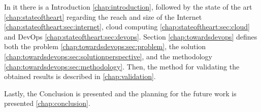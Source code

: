     	In it there is a Introduction \ref{chap:introduction}, followed by the state of the art \ref{chap:stateoftheart} regarding the reach and size of the Internet \ref{chap:stateoftheart:sec:internet}, cloud computing \ref{chap:stateoftheart:sec:cloud} and DevOps \ref{chap:stateoftheart:sec:devops}.
    	Section \ref{chap:towardsdevops} defines both the problem \ref{chap:towardsdevops:sec:problem}, the solution \ref{chap:towardsdevops:sec:solutionperspective}, and the methodology \ref{chap:towardsdevops:sec:methodology}.
    	Then, the method for validating the obtained results is described in \ref{chap:validation}.

    	Lastly, the Conclusion is presented and the planning for the future work is presented \ref{chap:conclusion}.  